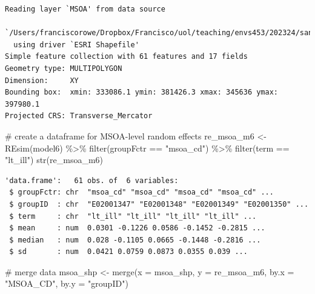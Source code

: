 \documentclass[
  letterpaper,
  DIV=11,
  numbers=noendperiod,
  oneside]{scrreprt}
\newenvironment{Shaded}{\begin{snugshade}}{\end{snugshade}}
\newcommand{\AttributeTok}[1]{\textcolor[rgb]{0.40,0.45,0.13}{#1}}
\newcommand{\CommentTok}[1]{\textcolor[rgb]{0.37,0.37,0.37}{#1}}
\newcommand{\FunctionTok}[1]{\textcolor[rgb]{0.28,0.35,0.67}{#1}}
\newcommand{\NormalTok}[1]{\textcolor[rgb]{0.00,0.23,0.31}{#1}}
\newcommand{\OtherTok}[1]{\textcolor[rgb]{0.00,0.23,0.31}{#1}}
\newcommand{\SpecialCharTok}[1]{\textcolor[rgb]{0.37,0.37,0.37}{#1}}
\newcommand{\StringTok}[1]{\textcolor[rgb]{0.13,0.47,0.30}{#1}}
\begin{document}
\begin{verbatim}
Reading layer `MSOA' from data source 
  `/Users/franciscorowe/Dropbox/Francisco/uol/teaching/envs453/202324/san/data/mlm/MSOA.shp' 
  using driver `ESRI Shapefile'
Simple feature collection with 61 features and 17 fields
Geometry type: MULTIPOLYGON
Dimension:     XY
Bounding box:  xmin: 333086.1 ymin: 381426.3 xmax: 345636 ymax: 397980.1
Projected CRS: Transverse_Mercator
\end{verbatim}

\begin{Shaded}
\begin{Highlighting}[]
\CommentTok{\# create a dataframe for MSOA{-}level random effects}
\NormalTok{re\_msoa\_m6 }\OtherTok{\textless{}{-}} \FunctionTok{REsim}\NormalTok{(model6) }\SpecialCharTok{\%\textgreater{}\%} \FunctionTok{filter}\NormalTok{(groupFctr }\SpecialCharTok{==} \StringTok{"msoa\_cd"}\NormalTok{) }\SpecialCharTok{\%\textgreater{}\%}
  \FunctionTok{filter}\NormalTok{(term }\SpecialCharTok{==} \StringTok{"lt\_ill"}\NormalTok{)}
\FunctionTok{str}\NormalTok{(re\_msoa\_m6)}
\end{Highlighting}
\end{Shaded}

\begin{verbatim}
'data.frame':   61 obs. of  6 variables:
 $ groupFctr: chr  "msoa_cd" "msoa_cd" "msoa_cd" "msoa_cd" ...
 $ groupID  : chr  "E02001347" "E02001348" "E02001349" "E02001350" ...
 $ term     : chr  "lt_ill" "lt_ill" "lt_ill" "lt_ill" ...
 $ mean     : num  0.0301 -0.1226 0.0586 -0.1452 -0.2815 ...
 $ median   : num  0.028 -0.1105 0.0665 -0.1448 -0.2816 ...
 $ sd       : num  0.0421 0.0759 0.0873 0.0355 0.039 ...
\end{verbatim}

\begin{Shaded}
\begin{Highlighting}[]
\CommentTok{\# merge data}
\NormalTok{msoa\_shp }\OtherTok{\textless{}{-}} \FunctionTok{merge}\NormalTok{(}\AttributeTok{x =}\NormalTok{ msoa\_shp, }\AttributeTok{y =}\NormalTok{ re\_msoa\_m6, }\AttributeTok{by.x =} \StringTok{"MSOA\_CD"}\NormalTok{, }\AttributeTok{by.y =} \StringTok{"groupID"}\NormalTok{)}
\end{Highlighting}
\end{Shaded}
\end{document}

